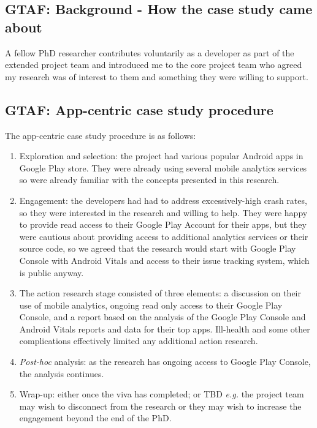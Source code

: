 
\subsection{GTAF: Background - How the case study came about}
A fellow PhD researcher contributes voluntarily as a developer as part of the extended project team and introduced me to the core project team who agreed my research was of interest to them and something they were willing to support.

\subsection{GTAF: App-centric case study procedure}
The app-centric case study procedure is as follows:
{\small
\begin{enumerate}
    \itemsep0em
    \item Exploration and selection: the project had various popular Android apps in Google Play store. They were already using several mobile analytics services so were already familiar with the concepts presented in this research.
    \item Engagement: the developers had had to address excessively-high crash rates, so they were interested in the research and willing to help. They were happy to provide read access to their Google Play Account for their apps, but they were cautious about providing access to additional analytics services or their source code, so we agreed that the research would start with Google Play Console with Android Vitals and access to their issue tracking system, which is public anyway.
    \item The action research stage consisted of three elements: a discussion on their use of mobile analytics, ongoing read only access to their Google Play Console, and a report based on the analysis of the Google Play Console and Android Vitals reports and data for their top apps. Ill-health and some other complications effectively limited any additional action research. 
    \item \textit{Post-hoc} analysis: as the research has ongoing access to Google Play Console, the analysis continues.
    \item Wrap-up: either once the viva has completed; or TBD \textit{e.g.} the project team may wish to disconnect from the research or they may wish to increase the engagement beyond the end of the PhD.
\end{enumerate}
}


